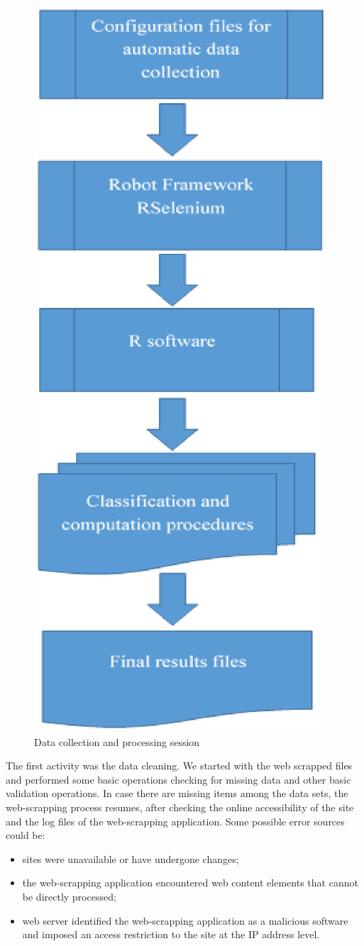 \documentclass[]{article}
\begin{document}
\begin{figure}
	\centering
	\includegraphics[width=0.7\linewidth]{fig6.eps}
	\caption{Data collection and processing session}
	\label{fig:6}
\end{figure}


The first activity was the data cleaning. We started with 
the web scrapped files and performed some basic operations checking for missing data and other basic validation operations. 
In case there are missing items among the data sets, the web-scrapping process resumes, after checking the online accessibility 
of the site and the log files of the web-scrapping application. Some possible error sources could be: 
\begin{itemize}
	\item sites were unavailable or have undergone changes;
	\item the web-scrapping application encountered web content elements that cannot be directly processed;
	\item web server identified the web-scrapping application as a malicious software and imposed an access restriction to the site at the IP address level.
\end{itemize}
\end{document}
